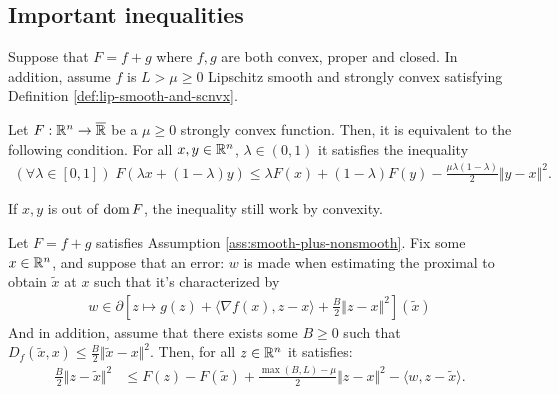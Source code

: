 \documentclass[12pt]{article}
\begin{document}
    \subsection{Important inequalities}
        \begin{assumption}\label{ass:smooth-plus-nonsmooth}
            Suppose that $F = f + g$ where $f, g$ are both convex, proper and closed. 
            In addition, assume $f$ is $L > \mu \ge 0$ Lipschitz smooth and strongly convex satisfying Definition \ref{def:lip-smooth-and-scnvx}. 
        \end{assumption}
        \begin{theorem}\label{thm:jesen}
            Let $F: \mathbb R^n \rightarrow \overline {\mathbb R}$ be a $\mu \ge 0$ strongly convex function. 
            Then, it is equivalent to the following condition. 
            For all $x, y \in \mathbb R^n$, $\lambda \in (0, 1)$ it satisfies the inequality 
            \begin{align*}
                (\forall \lambda \in [0, 1])\; 
                F(\lambda x + (1 - \lambda)y) \le \lambda F(x) + (1 - \lambda)F(y) -\frac{\mu\lambda(1 - \lambda)}{2} \Vert y - x\Vert^2. 
            \end{align*}
        \end{theorem}
        \begin{remark}
            If $x, y$ is out of $\operatorname{dom} F$, the inequality still work by convexity. 
        \end{remark}
        \begin{lemma}\label{lemma:inex-pg-ineq-proto}
            Let $F = f + g$ satisfies Assumption \ref{ass:smooth-plus-nonsmooth}. 
            Fix some $x \in \mathbb R^n$, and suppose that an error: $w$ is made when estimating the proximal to obtain $\tilde x$ at $x$ such that it's characterized by
            \begin{align*}
                w \in \partial \left[
                    z \mapsto g(z) + \langle \nabla f(x), z - x\rangle + \frac{B}{2}\Vert z - x\Vert^2
                \right](\tilde x)
            \end{align*}
            And in addition, assume that there exists some $B \ge 0$ such that $D_f(\tilde x, x) \le \frac{B}{2}\Vert \tilde x - x\Vert^2$. 
            Then, for all $z \in \mathbb R^n$ it satisfies: 
            \begin{align*}
                \frac{B}{2}\Vert z - \tilde x\Vert^2 &\le 
                F(z) - F(\tilde x) + \frac{\max(B, L) - \mu}{2}\Vert z - x\Vert^2 - \langle w, z - \tilde x \rangle. 
            \end{align*}
        \end{lemma}
\end{document}
